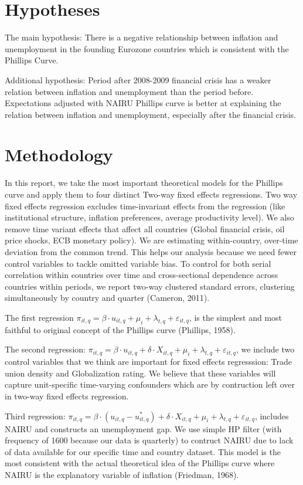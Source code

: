 \documentclass[preprint,10pt,authoryear]{elsarticle}
\begin{document}
\section{Hypotheses}
The main hypothesis: There is a negative relationship between inflation and unemployment in the founding Eurozone countries which is consistent with the Phillips Curve.

Additional hypothesis: Period after 2008-2009 financial crisis has a weaker relation between inflation and unemployment than the period before. Expectations adjusted with NAIRU Phillips curve is better at explaining the relation between inflation and unemployment, especially after the financial crisis.

\section{Methodology}
In this report, we take the most important theoretical models for the Phillips curve and apply them to four distinct Two-way fixed effects regressions. Two way fixed effects regression excludes time-invariant effects from the regression (like institutional structure, inflation preferences, average productivity level). We also remove time variant effects that affect all countries (Global financial crisis, oil price shocks, ECB monetary policy). We are estimating within-country, over-time deviation from the common trend. This helps our analysis because we need fewer control variables to tackle omitted variable bias. To control for both serial correlation within countries over time and cross-sectional dependence across countries within periods, we report two-way clustered standard errors, clustering simultaneously by country and quarter (Cameron, 2011).

The first regression $\pi_{it,q} = \beta \cdot u_{it,q} + \mu_{i} + \lambda_{t,q} + \varepsilon_{it,q}$, is the simplest and most faithful to original concept of the Phillips curve (Phillips, 1958).

The second regression: $\pi_{it,q} = \beta \cdot u_{it,q} + \delta \cdot X_{it,q} + \mu_{i} + \lambda_{t,q} + \varepsilon_{it,q}$, we include two control variables that we think are important for fixed effects regresssion: Trade union density and Globalization rating. We believe that these variables will capture unit-specific time-varying confounders which are by contruction left over in two-way fixed effects regression.

Third regression: $\pi_{it,q} = \beta \cdot (u_{it,q} - u^{*}_{it,q}) + \delta \cdot X_{it,q} + \mu_{i} + \lambda_{t,q} + \varepsilon_{it,q}$, includes NAIRU and constructs an unemployment gap. We use simple HP filter (with frequency of 1600 because our data is quarterly) to contruct NAIRU due to lack of data available for our specific time and country dataset. This model is the most consistent with the actual theoretical idea of the Phillips curve where NAIRU is the explanatory variable of inflation (Friedman, 1968).
\end{document}
